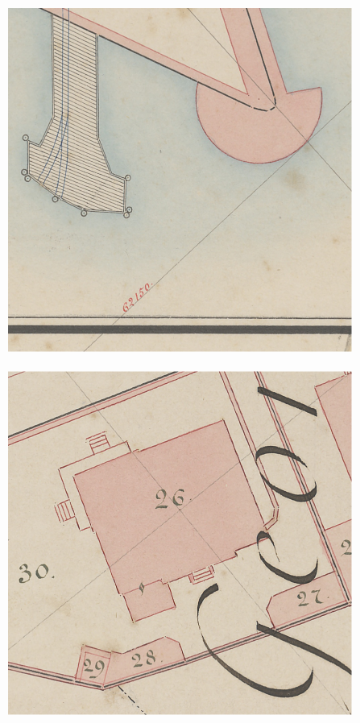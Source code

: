 \documentclass[12pt]{article}
\begin{document}
\begin{figure}[H]
\begin{subfigure}[b]{.235\textwidth}
\begin{minipage}[t]{1\linewidth}
		\end{minipage}
	\end{subfigure}
	\begin{subfigure}[b]{.235\textwidth}
		\begin{minipage}[t]{1\linewidth}
			\centering
			\includegraphics[width=1\linewidth]{images/patches/img8.png}
		\end{minipage}
	\end{subfigure}
	\begin{subfigure}[b]{.235\textwidth}
		\begin{minipage}[t]{1\linewidth}
			\centering
			\includegraphics[width=1\linewidth]{images/patches/img7.png}
		\end{minipage}
	\end{subfigure}
	

\end{figure}
\end{document}
